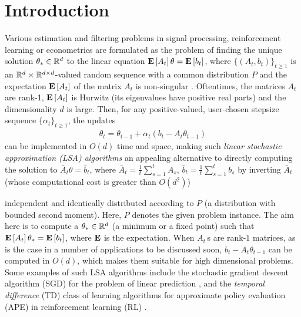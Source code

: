 
\section{Introduction}\label{sec:intro}
Various estimation and filtering problems in signal processing, reinforcement learning or econometrics
are formulated as the problem of finding the unique solution $\theta_*\in \mathbb{R}^d$ 
to the linear equation $\mathbf{E}\left[A_t\right] \theta = \mathbf{E}\left[b_t\right]$,
where $\{(A_t,b_t)\}_{t\ge 1}$ is an $\mathbb{R}^d \times \mathbb{R}^{d \times d}$-valued random sequence with a common distribution $P$
and the expectation $\mathbf{E}\left[A_t\right]$ of the matrix $A_t$ is non-singular \citep[e.g.,][]{bemepri90,LjPfWa92,SoKo94,degylu96,
sutton,konda-tsitsiklis,KoTsi03LSA,gtd,gtd2,gtdmp}.
Oftentimes, the matrices $A_t$ are rank-1, $\mathbf{E}\left[A_t\right]$ is Hurwitz (its eigenvalues have positive real parts)
and the dimensionality $d$ is large.
Then, for any positive-valued, user-chosen stepsize sequence $\{\alpha_t\}_{t\ge 1}$, the updates
\begin{align}\label{eq:lsaintro}
\theta_t=\theta_{t-1}+\alpha_t (b_t-A_t \theta_{t-1})
\end{align}
can be implemented in $O(d)$ time and space, making such 
\emph{linear stochastic approximation (LSA) algorithms} 
an appealing alternative to directly 
computing the solution to $\bar A_t \theta = \bar b_t$, where $\bar A_t = \frac1t\sum_{s=1}^t A_s$, $\bar b_t = \frac1t \sum_{s=1}^t b_s$ by inverting $\bar A_t$ (whose computational cost is greater than $O(d^2)$)

independent and identically distributed according to $P$ (a distribution with bounded second moment). Here, $P$ denotes the given problem instance. The aim here is to compute a $\theta_*\in\mathbb{R}^d$ (a minimum or a fixed point) such that $\mathbf{E}\left[A_t\right]\theta_*=\mathbf{E}\left[b_t\right]$, where $\mathbf{E}$ is the expectation. When $A_t\,$s are rank-$1$ matrices, as is the case in a number of applications to be discussed soon, $b_t -A_t\theta_{t-1}$ can be computed in $O(d)$, which makes them suitable for high dimensional problems. Some examples of such LSA algorithms include the stochastic gradient descent algorithm (SGD) for the problem of linear prediction \cite{bach,bachaistats}, and the \emph{temporal difference} (TD) class of learning algorithms for approximate policy evaluation (APE) in reinforcement learning (RL) \cite{sutton,konda-tsitsiklis,KoTsi03LSA,gtd,gtd2,gtdmp}.
\fi

